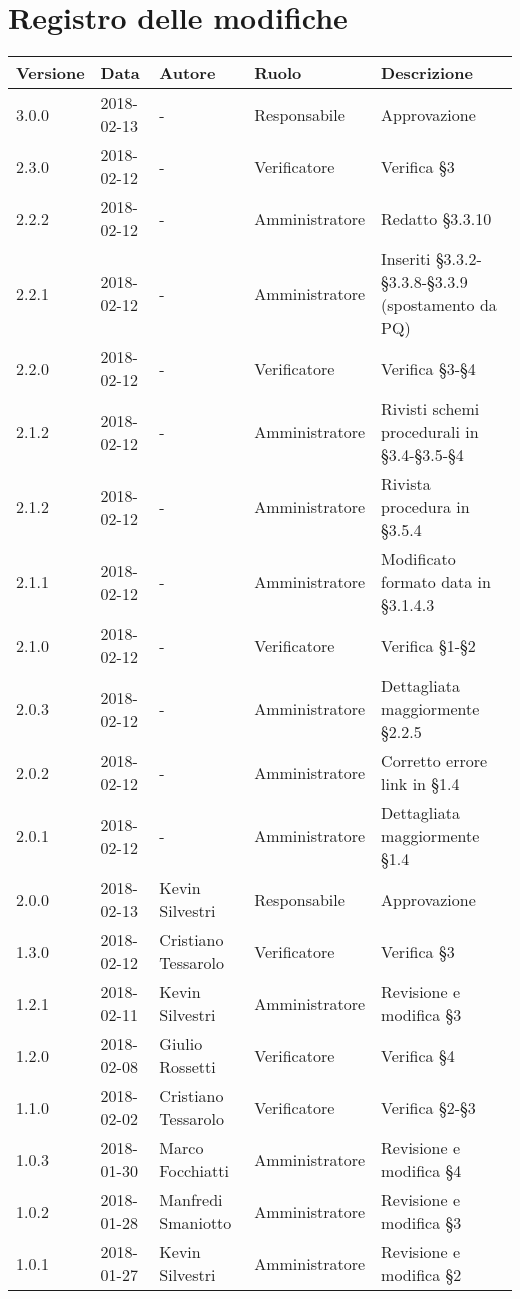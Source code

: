 \documentclass[./NormediProgetto.tex]{subfiles}
\begin{document}
\chapter*{Registro delle modifiche}
\setlength\LTleft{-22mm}
\begin{longtable}{|p{20mm}|p{20mm}|p{40mm}|p{30mm}|p{50mm}|}
	\hline
	\textbf{Versione} & \textbf{Data} & \textbf{Autore} & \textbf{Ruolo} & \textbf{Descrizione} \\ \hline 
		
		3.0.0 & 2018-02-13 & - & Responsabile & Approvazione\\ \hline
		2.3.0 & 2018-02-12 & - & Verificatore &  Verifica §3\\ \hline
		2.2.2 & 2018-02-12 & - & Amministratore &  Redatto §3.3.10\\ \hline
		2.2.1 & 2018-02-12 & - & Amministratore &  Inseriti §3.3.2-§3.3.8-§3.3.9 (spostamento da PQ)\\ \hline
		2.2.0 & 2018-02-12 & - & Verificatore &  Verifica §3-§4\\ \hline
		2.1.2 & 2018-02-12 & - & Amministratore &  Rivisti schemi procedurali in §3.4-§3.5-§4\\ \hline
		2.1.2 & 2018-02-12 & - & Amministratore &  Rivista procedura in §3.5.4\\ \hline
		2.1.1 & 2018-02-12 & - & Amministratore &  Modificato formato data in §3.1.4.3\\ \hline
		2.1.0 & 2018-02-12 & - & Verificatore &  Verifica §1-§2\\ \hline
		2.0.3 & 2018-02-12 & - & Amministratore &  Dettagliata maggiormente §2.2.5\\ \hline
		2.0.2 & 2018-02-12 & - & Amministratore &  Corretto errore link in §1.4\\ \hline
		2.0.1 & 2018-02-12 & - & Amministratore &  Dettagliata maggiormente §1.4\\ 
		
		\hline \hline
		
		2.0.0 & 2018-02-13 & Kevin Silvestri & Responsabile & Approvazione\\ \hline
		1.3.0 & 2018-02-12 & Cristiano Tessarolo & Verificatore &  Verifica §3\\ \hline
		1.2.1 & 2018-02-11 & Kevin Silvestri & Amministratore & Revisione e modifica §3\\ \hline
		1.2.0 & 2018-02-08 & Giulio Rossetti & Verificatore & Verifica §4\\ \hline  
		1.1.0 & 2018-02-02 & Cristiano Tessarolo & Verificatore & Verifica §2-§3\\ \hline 
		1.0.3 & 2018-01-30 & Marco Focchiatti & Amministratore & Revisione e modifica §4\\ \hline 
		1.0.2 & 2018-01-28 & Manfredi Smaniotto & Amministratore & Revisione e modifica §3\\ \hline 
		1.0.1 & 2018-01-27 & Kevin Silvestri & Amministratore & Revisione e modifica §2\\
		

\end{longtable}
\end{document}
